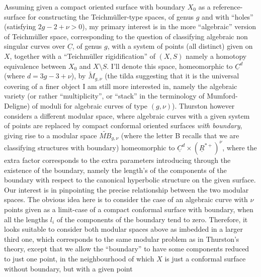 \documentclass[11pt,a4paper]{article}
\begin{document}
Assuming given a compact oriented surface with boundary $X_{0}$
\struck{\ill{}} as a reference-surface for constructing the Teichmüller-type
spaces, of genus $g$ and with “holes” (satisfying $2g-2+\nu > 0$), my primary
interest is in the more “algebraic” version of Teichmüller space,
corresponding to the question of classifying algebraic non singular curves
over $\underline{C}$, of genus $g$, with a system of \supplied{$\nu$} points (all
distinct) given on $X$, together with a “Teichmüller rigidification” of
$(X,S)$ namely a homotopy equivalence between $X_{0}$ and $X \setminus S$.
I'll denote this space, homeomorphic to $\underline{C}^{d}$ (where
$d = 3g-3+\nu$), by $\widetilde{M}_{g,\nu}$ (the tilda suggesting that it is
the universal covering of a finer object I am still more interested in,
namely the algebraic variety (or rather “multiplicity”, or “stack” in the
terminology of Mumford-Deligne) of moduli for algebraic curves of type
$(g,\nu)$). Thurston however considers a different modular space, where
algebraic curves with a given system of points are replaced by compact
conformal oriented surfaces \emph{with boundary}, giving rise to a modular
space $\widetilde{MB}_{g,\nu}$ (where the letter B recalls that we are
classifying structures with boundary) homeomorphic to
$\underline{C}^{d} \times (\underline{R}^{*+})^{\nu}$, where the extra factor
\struck{\ill{}} corresponds to the extra parameters introducing through the
existence of the boundary, namely the length's of the \struck{\ill{}}
components of the boundary with respect to the canonical hyperbolic structure
on the given surface. Our interest is in pinpointing the precise relationship
between the two modular spaces. The obvious idea here is to consider the case
of an algebraic curve with $\nu$ points given as a limit-case of a compact
conformal surface with boundary, when all the lengths $l_{i}$ of the
components of the boundary tend to zero. Therefore, it looks suitable to
consider both modular spaces above as imbedded in a larger third one, which
corresponds to the same modular problem as in Thurston's theory, except that
we allow the “boundary” to have some components reduced to just one point, in
the neighbourhood of which $X$ is just a conformal surface without boundary,
but with a given point
\end{document}
